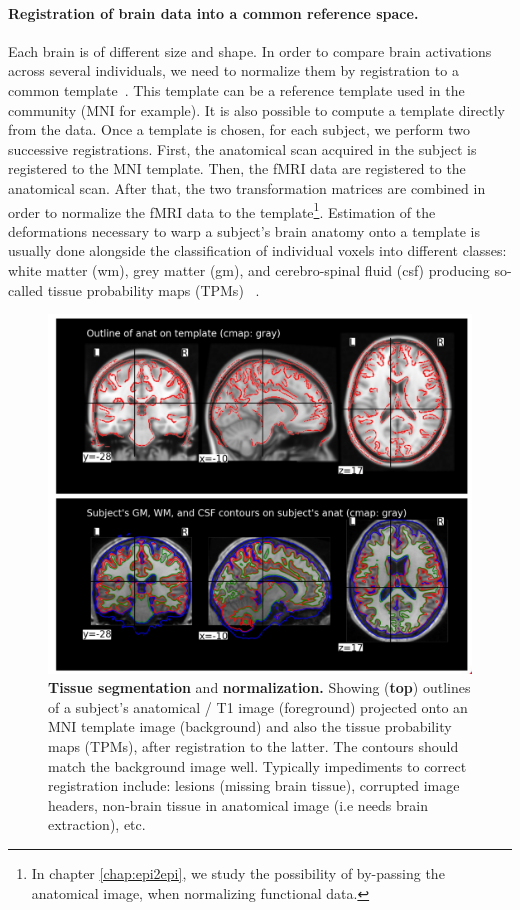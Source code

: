 \paragraph{Registration of brain data into a common reference space.}
Each brain is of different size
and shape. In order to compare brain activations across several individuals, we
need to normalize them by registration to a common template~\citep{fristonbook,ashburner2005,ashburner2007,pmid19195496}. This template
can be a reference template used in the community (MNI for example). It is
also possible to compute a template directly from the data. Once a template
is chosen, for each subject, we perform two successive registrations. First,
the anatomical scan acquired in the subject is registered to the MNI template.
Then, the fMRI data are registered to the anatomical scan. After that, the two
transformation matrices are combined in order to normalize the fMRI data to
the template\footnote{In chapter \ref{chap:epi2epi}, we study the possibility of by-passing the anatomical image, when normalizing functional data.}. Estimation of the deformations necessary to warp a subject's brain anatomy onto a template is usually done alongside the classification of individual voxels into different classes: white matter (wm), grey matter (gm), and cerebro-spinal fluid (csf) producing so-called tissue probability maps (TPMs) ~\citep{ashburner2005}.

\begin{figure}
  \includegraphics[width=1\linewidth]{figures/normalize.png}
  \caption{\textbf{Tissue segmentation} and \textbf{normalization.} Showing (\textbf{top}) outlines of a subject's anatomical / T1 image (foreground) projected onto an MNI template image (background) and also the tissue probability maps (TPMs), after registration to the latter. The contours should match the background image well. 
    Typically impediments to correct registration include:
    lesions (missing brain tissue), corrupted image headers,
non-brain tissue in anatomical image (i.e needs brain
extraction), etc.}
\end{figure}

